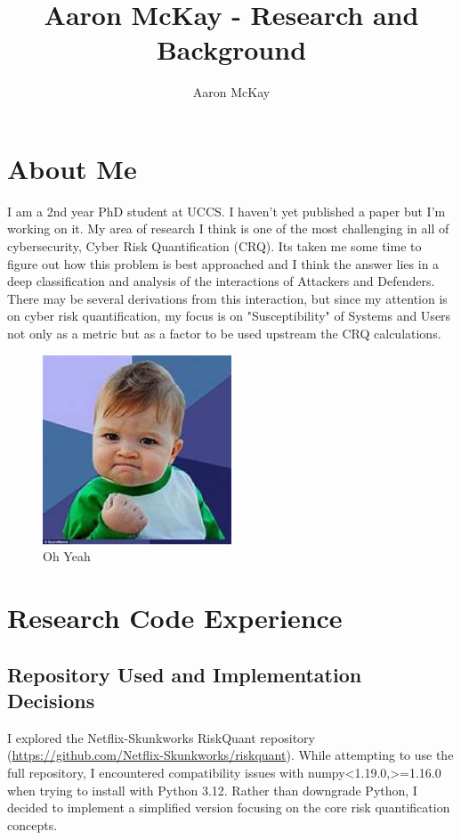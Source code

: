 \documentclass{article}
\begin{document}
\title{Aaron McKay - Research and Background}
\author{Aaron McKay}
\maketitle

\section{About Me}
I am a 2nd year PhD student at UCCS.  I haven't yet published a paper but I'm working on it.  My area of research I think is one of the most challenging in all of cybersecurity, Cyber Risk Quantification (CRQ).  Its taken me some time to figure out how this problem is best approached and I think the answer lies in a deep classification and analysis of the interactions of Attackers and Defenders. There may be several derivations from this interaction, but since my attention is on cyber risk quantification, my focus is on "Susceptibility" of Systems and Users not only as a metric but as a factor to be used upstream the CRQ calculations.

\begin{figure}[h]
    \centering
    \includegraphics[width=0.5\textwidth]{images/Oh_Yeah.jpg}
    \caption{Oh Yeah}
    \label{fig:oh-yeah}
\end{figure}

\section{Research Code Experience}
\subsection{Repository Used and Implementation Decisions}
I explored the Netflix-Skunkworks RiskQuant repository 
(\url{https://github.com/Netflix-Skunkworks/riskquant}). While attempting to use 
the full repository, I encountered compatibility issues with numpy<1.19.0,>=1.16.0 
when trying to install with Python 3.12. Rather than downgrade Python, I decided to 
implement a simplified version focusing on the core risk quantification concepts.
\end{document}
